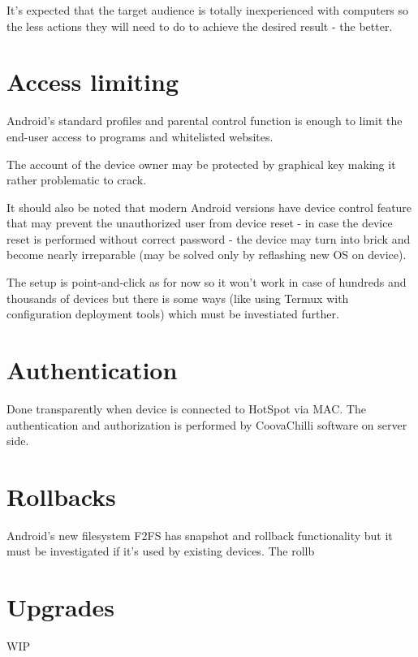 \documentclass[a4paper, sans, booktabs, totpages, english]{report}
\begin{document}
It's expected that the target audience is totally inexperienced with
computers so the less actions they will need to do to achieve the
desired result - the better.


\section{Access limiting}

Android's standard profiles and parental control function is enough to
limit the end-user access to programs and whitelisted websites.

The account of the device owner may be protected by graphical key
making it rather problematic to crack.

It should also be noted that modern Android versions have device control
feature that may prevent the unauthorized user from device reset -
in case the device reset is performed without correct password - the
device may turn into brick and become nearly irreparable (may be
solved only by reflashing new OS on device).

The setup is point-and-click as for now so it won't work in case of
hundreds and thousands of devices but there is some ways (like using
Termux with configuration deployment tools) which must be investiated
further.


\section{Authentication}

Done transparently when device is connected to HotSpot via MAC. The
authentication and authorization is performed by CoovaChilli software
on server side.


\section{Rollbacks}

Android's new filesystem F2FS has snapshot and rollback functionality
but it must be investigated if it's used by existing devices. The
rollb


\section{Upgrades}

WIP
\end{document}
